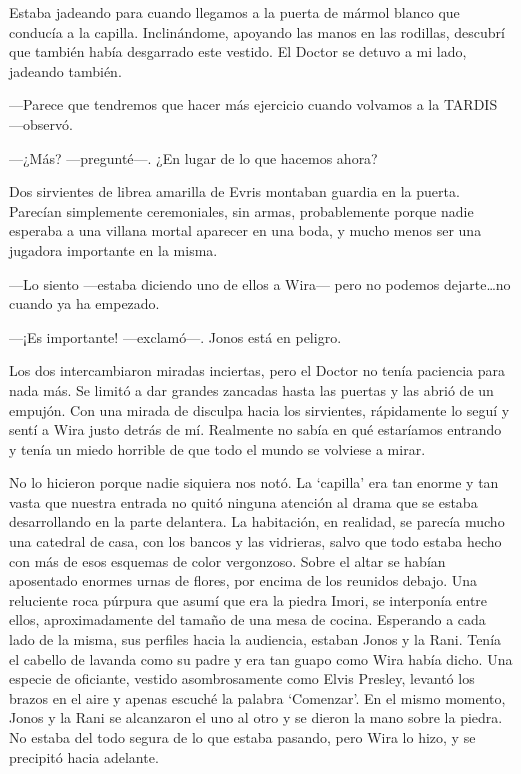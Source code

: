 Estaba jadeando para cuando llegamos a la puerta de mármol blanco que
conducía a la capilla. Inclinándome, apoyando las manos en las rodillas,
descubrí que también había desgarrado este vestido. El Doctor se detuvo
a mi lado, jadeando también.

---Parece que tendremos que hacer más ejercicio cuando volvamos a la
TARDIS ---observó.

---¿Más? ---pregunté---. ¿En lugar de lo que hacemos ahora?

Dos sirvientes de librea amarilla de Evris montaban guardia en la
puerta. Parecían simplemente ceremoniales, sin armas, probablemente
porque nadie esperaba a una villana mortal aparecer en una boda, y mucho
menos ser una jugadora importante en la misma.

---Lo siento ---estaba diciendo uno de ellos a Wira--- pero no podemos
dejarte\ldots{}no cuando ya ha empezado.

---¡Es importante! ---exclamó---. Jonos está en peligro.

Los dos intercambiaron miradas inciertas, pero el Doctor no tenía
paciencia para nada más. Se limitó a dar grandes zancadas hasta las
puertas y las abrió de un empujón. Con una mirada de disculpa hacia los
sirvientes, rápidamente lo seguí y sentí a Wira justo detrás de mí.
Realmente no sabía en qué estaríamos entrando y tenía un miedo horrible
de que todo el mundo se volviese a mirar.

No lo hicieron porque nadie siquiera nos notó. La `capilla' era tan
enorme y tan vasta que nuestra entrada no quitó ninguna atención al
drama que se estaba desarrollando en la parte delantera. La habitación,
en realidad, se parecía mucho una catedral de casa, con los bancos y las
vidrieras, salvo que todo estaba hecho con más de esos esquemas de color
vergonzoso. Sobre el altar se habían aposentado enormes urnas de flores,
por encima de los reunidos debajo. Una reluciente roca púrpura que asumí
que era la piedra Imori, se interponía entre ellos, aproximadamente del
tamaño de una mesa de cocina. Esperando a cada lado de la misma, sus
perfiles hacia la audiencia, estaban Jonos y la Rani. Tenía el cabello
de lavanda como su padre y era tan guapo como Wira había dicho. Una
especie de oficiante, vestido asombrosamente como Elvis Presley, levantó
los brazos en el aire y apenas escuché la palabra `Comenzar'. En el
mismo momento, Jonos y la Rani se alcanzaron el uno al otro y se dieron
la mano sobre la piedra. No estaba del todo segura de lo que estaba
pasando, pero Wira lo hizo, y se precipitó hacia adelante.

